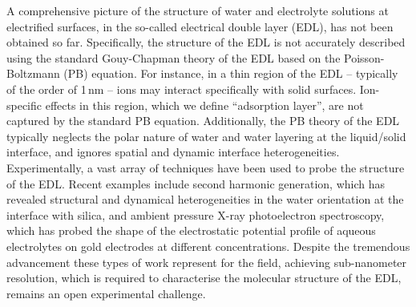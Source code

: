 \documentclass[journal=ancac3,manuscript=article,layout=twocolumn]{achemso}
\begin{document}
A comprehensive picture of the structure of
water and electrolyte solutions
at electrified surfaces, in the
so-called electrical double layer (EDL),
has not been obtained so far.
Specifically, the structure of the EDL is not
accurately described using
the standard Gouy-Chapman theory
of the EDL based on the Poisson-Boltzmann (PB)
equation\cite{Hunter2001}.
For instance, in a thin
region of the EDL -- typically of the order of 1\,nm --
ions may interact specifically with solid
surfaces. Ion-specific
effects in this region, which we define ``adsorption layer'', are not captured
by the standard PB equation\cite{luo2006ion,huang2007ion}.
Additionally, the PB theory
of the EDL typically neglects the polar nature
of water and water layering at the liquid/solid
interface, and ignores
spatial and dynamic interface heterogeneities\cite{gonella2021water,Hartkamp2018,Markovich2016,Bonthuis2013,limmer2013hydration}.
Experimentally, a vast array of techniques have been used to probe
the structure of the EDL\cite{Hartkamp2018}. Recent examples include
second harmonic generation, which has
revealed structural and dynamical
heterogeneities in the water orientation
at the interface with silica\cite{macias2017optical},
and ambient pressure X-ray photoelectron spectroscopy,
which has probed the shape of the electrostatic potential profile of aqueous electrolytes
on gold electrodes at different concentrations\cite{favaro2016unravelling}.
Despite the tremendous advancement these types of work represent
for the field, achieving sub-nanometer resolution, which is required
to characterise the molecular structure of the EDL,
remains an open experimental challenge.
\end{document}
